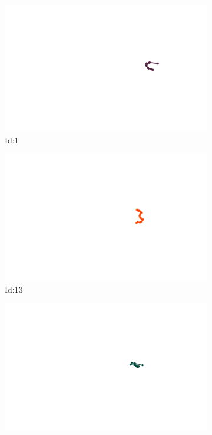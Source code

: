 \documentclass[12pt,twoside]{report}
\begin{document}
\begin{figure}
\centering
\begin{subfigure}[b]{0.20\textwidth}
\centering
\includegraphics[width=\textwidth]{../../trajectories/1.png}
\caption{Id:1}
\end{subfigure}
\begin{subfigure}[b]{0.20\textwidth}
\centering
\includegraphics[width=\textwidth]{../../trajectories/13.png}
\caption{Id:13}
\end{subfigure}
\begin{subfigure}[b]{0.20\textwidth}
\centering
\includegraphics[width=\textwidth]{../../trajectories/108.png}

\end{subfigure}
\end{figure}
\end{document}
